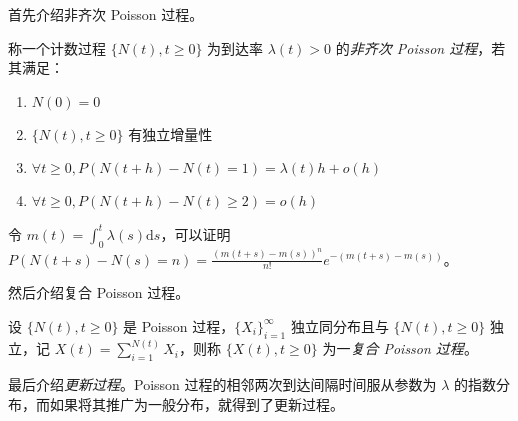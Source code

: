 \documentclass[../main.tex]{subfiles}
\begin{document}
首先介绍非齐次 Poisson 过程。

\begin{definition}\label{def:6.5.1}
    称一个计数过程 $\{N(t),t\geq0\}$ 为到达率 $\lambda(t)>0$ 的\emph{非齐次 Poisson 过程}，若其满足：
    \begin{enumerate}
        \item $N(0)=0$
        \item $\{N(t),t\geq0\}$ 有独立增量性
        \item $\forall t\geq0,P(N(t+h)-N(t)=1)=\lambda(t)h+o(h)$
        \item $\forall t\geq0,P(N(t+h)-N(t)\geq2)=o(h)$
    \end{enumerate}
\end{definition}

令 $m(t)=\int_0^t\lambda(s)\mathrm ds$，可以证明 $P(N(t+s)-N(s)=n)=\frac{(m(t+s)-m(s))^n}{n!}e^{-(m(t+s)-m(s))}$。

然后介绍复合 Poisson 过程。

\begin{definition}\label{def:6.5.2}
    设 $\{N(t),t\geq0\}$ 是 Poisson 过程，$\{X_i\}_{i=1}^\infty$ 独立同分布且与 $\{N(t),t\geq0\}$ 独立，记 $X(t)=\sum_{i=1}^{N(t)}X_i$，则称 $\{X(t),t\geq0\}$ 为一\emph{复合 Poisson 过程}。
\end{definition}

最后介绍\emph{更新过程}。Poisson 过程的相邻两次到达间隔时间服从参数为 $\lambda$ 的指数分布，而如果将其推广为一般分布，就得到了更新过程。
\end{document}
